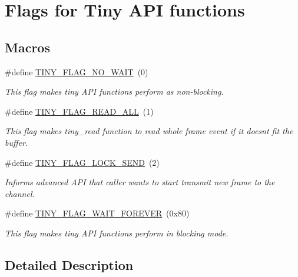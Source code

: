 \hypertarget{group__FLAGS__GROUP}{}\section{Flags for Tiny A\+P\+I functions}
\label{group__FLAGS__GROUP}
\subsection*{Macros}
\begin{DoxyCompactItemize}
\item 
\hypertarget{group__FLAGS__GROUP_gadadd60eb21d7949e6d097ad36aab9b2e}{}\#define \hyperlink{group__FLAGS__GROUP_gadadd60eb21d7949e6d097ad36aab9b2e}{T\+I\+N\+Y\+\_\+\+F\+L\+A\+G\+\_\+\+N\+O\+\_\+\+W\+A\+I\+T}~(0)\label{group__FLAGS__GROUP_gadadd60eb21d7949e6d097ad36aab9b2e}

\begin{DoxyCompactList}\small\item\em This flag makes tiny A\+P\+I functions perform as non-\/blocking. \end{DoxyCompactList}\item 
\hypertarget{group__FLAGS__GROUP_gae41123cfeed375e618a4152c9bbd0d6d}{}\#define \hyperlink{group__FLAGS__GROUP_gae41123cfeed375e618a4152c9bbd0d6d}{T\+I\+N\+Y\+\_\+\+F\+L\+A\+G\+\_\+\+R\+E\+A\+D\+\_\+\+A\+L\+L}~(1)\label{group__FLAGS__GROUP_gae41123cfeed375e618a4152c9bbd0d6d}

\begin{DoxyCompactList}\small\item\em This flag makes tiny\+\_\+read function to read whole frame event if it doesn\textquotesingle{}t fit the buffer. \end{DoxyCompactList}\item 
\hypertarget{group__FLAGS__GROUP_ga593e3353339a36dcd0746057e2864958}{}\#define \hyperlink{group__FLAGS__GROUP_ga593e3353339a36dcd0746057e2864958}{T\+I\+N\+Y\+\_\+\+F\+L\+A\+G\+\_\+\+L\+O\+C\+K\+\_\+\+S\+E\+N\+D}~(2)\label{group__FLAGS__GROUP_ga593e3353339a36dcd0746057e2864958}

\begin{DoxyCompactList}\small\item\em Informs advanced A\+P\+I that caller wants to start transmit new frame to the channel. \end{DoxyCompactList}\item 
\hypertarget{group__FLAGS__GROUP_ga3a34267804581c5709d03f52d232b307}{}\#define \hyperlink{group__FLAGS__GROUP_ga3a34267804581c5709d03f52d232b307}{T\+I\+N\+Y\+\_\+\+F\+L\+A\+G\+\_\+\+W\+A\+I\+T\+\_\+\+F\+O\+R\+E\+V\+E\+R}~(0x80)\label{group__FLAGS__GROUP_ga3a34267804581c5709d03f52d232b307}

\begin{DoxyCompactList}\small\item\em This flag makes tiny A\+P\+I functions perform in blocking mode. \end{DoxyCompactList}\end{DoxyCompactItemize}


\subsection{Detailed Description}
